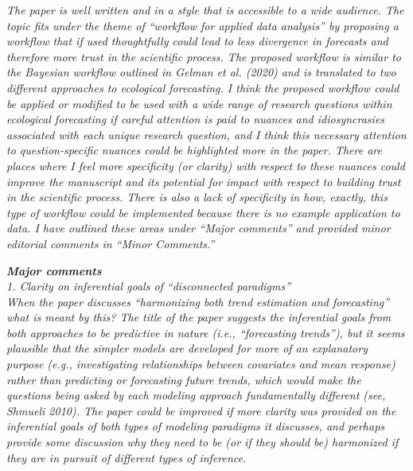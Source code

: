 \documentclass[11pt,letter]{article}
\begin{document}
\begin{mybox}
\emph{The paper is well written and in a style that is accessible to a wide audience. The topic fits under the theme of “workflow for applied data analysis” by proposing a workflow that if used thoughtfully could lead to less divergence in forecasts and therefore more trust in the scientific process. The proposed workflow is similar to the Bayesian workflow outlined in Gelman et al. (2020) and is translated to two different approaches to ecological forecasting. I think the proposed workflow could be applied or modified to be used with a wide range of research questions within ecological forecasting if careful attention is paid to nuances and idiosyncrasies associated with each unique research question, and I think this necessary attention to question-specific nuances could be highlighted more in the paper. There are places where I feel more specificity (or clarity) with respect to these nuances could improve the manuscript and its potential for impact with respect to building trust in the scientific process. There is also a lack of specificity in how, exactly, this type of workflow could be implemented because there
is no example application to data. I have outlined these areas under “Major comments” and provided minor editorial comments in “Minor Comments.”}
\end{mybox}


\begin{mybox}
\emph{\textbf{Major comments}\\
1. Clarity on inferential goals of “disconnected paradigms”\\
 When the paper discusses “harmonizing both trend estimation and forecasting” what is meant by this? The title of the paper suggests the inferential goals from both approaches to be predictive in nature (i.e., “forecasting trends”), but it seems plausible that the simpler models are developed for more of an explanatory purpose (e.g., investigating relationships between covariates and mean response) rather than predicting or forecasting future trends, which would make the questions being asked by each modeling approach fundamentally different (see, Shmueli 2010). The paper could be improved if more clarity was provided on the inferential goals of both types of modeling paradigms it discusses, and perhaps provide some discussion why they need to be (or if they should be) harmonized if they are in pursuit of different types of inference.}
\end{mybox}
\end{document}
